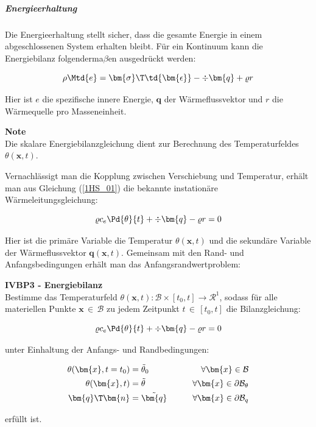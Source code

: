 
\subparagraph{Energieerhaltung}

Die Energieerhaltung stellt sicher, dass die gesamte Energie in einem abgeschlossenen System erhalten bleibt. Für ein Kontinuum kann die Energiebilanz folgenderma$\beta$en ausgedrückt werden:

\begin{equation}
\label{1HS_01}
\rho \Mtd{e} = \bm{\sigma}\T \td{\bm{\epsilon}} - \div{\bm{q}} + \varrho r
\end{equation}

Hier ist $e$ die spezifische innere Energie, $\bm{q}$ der Wärmeflussvektor und $r$ die Wärmequelle pro Masseneinheit.

\begin{framed}
\textbf{Note}\\
Die skalare Energiebilanzgleichung dient zur Berechnung des Temperaturfeldes $\theta(\bm{x},t)$.
\end{framed}

Vernachlässigt man die Kopplung zwischen Verschiebung und Temperatur, erhält man aus Gleichung (\ref{1HS_01}) die bekannte instationäre Wärmeleitungsgleichung:

\begin{equation}
\varrho c_e \Pd{\theta}{t} + \div{\bm{q}} - \varrho r = 0
\end{equation}

Hier ist die primäre Variable die Temperatur $\theta(\bm{x},t)$ und die sekundäre Variable der Wärmeflussvektor $\bm{q}(\bm{x},t)$. Gemeinsam mit den Rand- und Anfangsbedingungen erhält man das Anfangsrandwertproblem:

\begin{framed}
\textbf{IVBP3 - Energiebilanz}\\
Bestimme das Temperaturfeld $\theta(\bm{x},t): \mathcal{B} \times [t_0,t] \rightarrow \mathcal{R}^1$, sodass für alle materiellen Punkte $\bm{x} \, \in \, \mathcal{B}$ zu jedem Zeitpunkt $t \, \in \, [t_0,t]$ die Bilanzgleichung:

\begin{equation}
\varrho c_e \Pd{\theta}{t} + \div{\bm{q}} - \varrho r = 0
\end{equation}

unter Einhaltung der Anfangs- und Randbedingungen:

\begin{align}
\theta(\bm{x},t=t_0) & = \tilde{\theta}_0 \qquad &\forall \bm{x} \in \mathcal{B}& \\
\theta(\bm{x},t) & = \tilde{\theta} \qquad &\forall \bm{x} \in \partial \mathcal{B}_{\theta}& \\
\bm{q}\T \bm{n} & = \tilde{\bm{q}} \qquad &\forall \bm{x} \in \partial\mathcal{B}_q&
\end{align}

erfüllt ist.
\end{framed}

